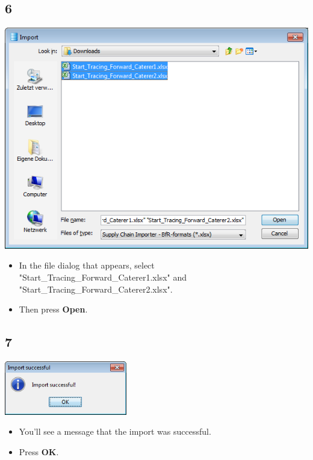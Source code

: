 \documentclass{beamer}
\begin{document}
\subsection{6}
\begin{frame}
	\begin{center}
  		\includegraphics[height=0.5\textheight]{6.png}
	\end{center}
	\begin{itemize}
		\item In the file dialog that appears, select "Start\_Tracing\_Forward\_Caterer1.xlsx" and "Start\_Tracing\_Forward\_Caterer2.xlsx".
		\item Then press \textbf{Open}.
	\end{itemize}
\end{frame}

\subsection{7}
\begin{frame}
	\begin{center}
  		\includegraphics[width=0.4\textwidth]{7.png}
	\end{center}
	\begin{itemize}
		\item You'll see a message that the import was successful.
		\item Press \textbf{OK}.
	\end{itemize}
\end{frame}
\end{document}
